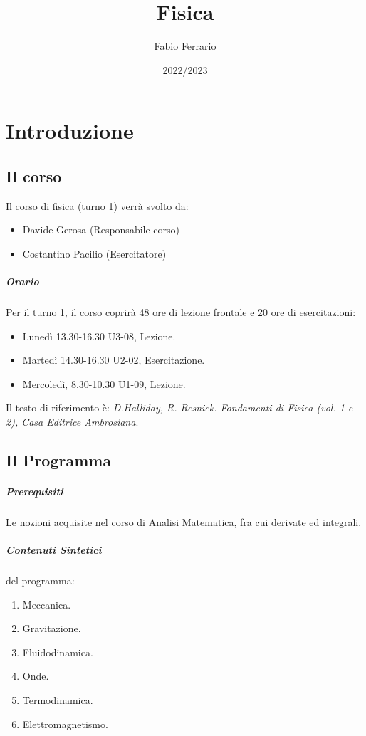 \documentclass[12pt, a4paper, openany]{book}
\begin{document}
\title{Fisica}
\author{Fabio Ferrario}
\date{2022/2023}
\maketitle

\tableofcontents

\chapter{Introduzione}

\section{Il corso}
Il corso di fisica (turno 1) verrà svolto da:
\begin{itemize}
    \item Davide Gerosa (Responsabile corso)
    \item Costantino Pacilio (Esercitatore)
\end{itemize} 
\paragraph*{Orario} Per il turno 1, il corso coprirà 48 ore di lezione frontale e 20 ore di esercitazioni:
\begin{itemize}
    \item Lunedì 13.30-16.30 U3-08, Lezione.
    \item Martedì 14.30-16.30 U2-02, Esercitazione.
    \item Mercoledì, 8.30-10.30 U1-09, Lezione.  
\end{itemize}
Il testo di riferimento è: \emph{D.Halliday, R. Resnick. Fondamenti di Fisica (vol. 1 e 2), Casa Editrice Ambrosiana}.

\section{Il Programma}
\paragraph*{Prerequisiti} Le nozioni acquisite nel corso di Analisi Matematica, fra cui derivate ed integrali.

\paragraph*{Contenuti Sintetici} del programma:
\begin{enumerate}
    \item Meccanica.
    \item Gravitazione.
    \item Fluidodinamica.
    \item Onde.
    \item Termodinamica.
    \item Elettromagnetismo.
\end{enumerate}
\end{document}
